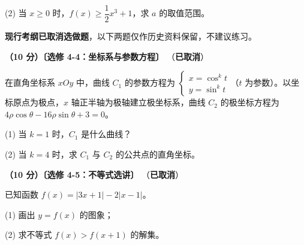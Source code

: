   (2) 当 $x\ge0$ 时，$f(x)\ge\dfrac12x^{3}+1$，求 $a$ 的取值范围。

\par\medskip


\begin{gktip}
\textbf{ 现行考纲已取消选做题}，以下两题仅作历史资料保留，不建议练习。
\end{gktip}

\textbf{（10 分）〔选修 4-4：坐标系与参数方程〕} （\textbf{已取消}）

在直角坐标系 $xOy$ 中，曲线 $C_1$ 的参数方程为 $\begin{cases}x=\cos^{k}t\\ y=\sin^{k}t\end{cases}$（$t$ 为参数）。以坐标原点为极点，$x$ 轴正半轴为极轴建立极坐标系，曲线 $C_2$ 的极坐标方程为 $4\rho\cos\theta-16\rho\sin\theta+3=0$。

  (1) 当 $k=1$ 时，$C_1$ 是什么曲线？

  (2) 当 $k=4$ 时，求 $C_1$ 与 $C_2$ 的公共点的直角坐标。

\textbf{（10 分）〔选修 4-5：不等式选讲〕} （\textbf{已取消}）

已知函数 $f(x)=|3x+1|-2|x-1|$。

  (1) 画出 $y=f(x)$ 的图象；

  (2) 求不等式 $f(x)>f(x+1)$ 的解集。

\par\medskip

